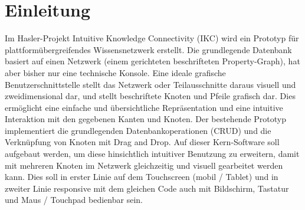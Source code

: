 \chapter{Einleitung}

Im Hasler-Projekt Intuitive Knowledge Connectivity (IKC) wird ein Prototyp für plattformübergreifendes Wissensnetzwerk erstellt. Die grundlegende Datenbank basiert auf einen Netzwerk (einem gerichteten beschrifteten Property-Graph), hat aber bisher nur eine technische Konsole. Eine ideale grafische Benutzerschnittstelle stellt das Netzwerk oder Teilausschnitte daraus visuell und zweidimensional dar, und stellt beschriftete Knoten und Pfeile grafisch dar. Dies ermöglicht eine einfache und übersichtliche Repräsentation und eine intuitive Interaktion mit den gegebenen Kanten und Knoten. Der bestehende Prototyp implementiert die grundlegenden Datenbankoperationen (CRUD) und die Verknüpfung von Knoten mit Drag and Drop. Auf dieser Kern-Software soll aufgebaut werden, um diese hinsichtlich intuitiver Benutzung zu erweitern, damit mit mehreren Knoten im Netzwerk gleichzeitig und visuell gearbeitet werden kann. Dies soll in erster Linie auf dem Touchscreen (mobil / Tablet) und in zweiter Linie responsive mit dem gleichen Code auch mit Bildschirm, Tastatur und Maus / Touchpad bedienbar sein.